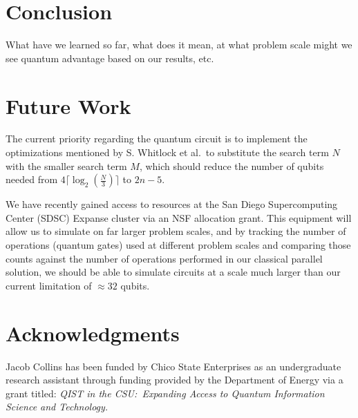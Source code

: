\documentclass[twocolumn]{cinc}
\begin{document}
\section{Conclusion}

\balance

What have we learned so far, what does it mean, at what problem scale might
we see quantum advantage based on our results, etc.

\section{Future Work}
 
The current priority regarding the quantum circuit is to implement the optimizations
mentioned by S. Whitlock et al.\ to substitute the search term $N$ with the smaller
search term $M$, which should reduce the number of qubits needed from 
$4 \lceil \log_2(\frac{N}{3})\rceil$ to $2n-5$.

We have recently gained access to resources at the San Diego Supercomputing 
Center (SDSC) Expanse cluster via an NSF allocation grant. This equipment will allow us to
simulate on far larger problem scales, and by tracking the number of operations (quantum gates)
used at different problem scales and comparing those counts against the number of operations
performed in our classical parallel solution, we should be able to simulate circuits at a scale
much larger than our current limitation of $\approx 32$ qubits.

\section*{Acknowledgments}  
% 
Jacob Collins has been funded by Chico State Enterprises as an undergraduate research assistant
through funding provided by the Department of Energy via a grant titled: \textit{QIST in the CSU:\ 
Expanding Access to Quantum Information Science and Technology.}



\end{document}
